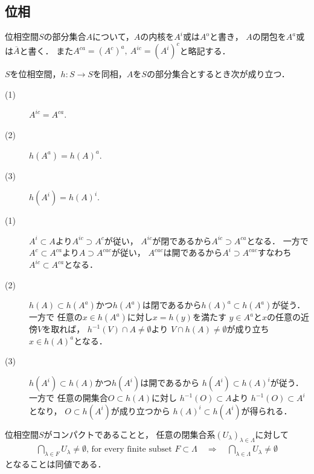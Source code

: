\subsection{位相}
	位相空間$S$の部分集合$A$について，$A$の内核を$A^i$或は$A^{\mathrm{o}}$と書き，
	$A$の閉包を$A^a$或は$\overline{A}$と書く．
	また$A^{ca} = (A^c)^a,\ A^{ic} = (A^i)^c$と略記する．
	\begin{screen}
		\begin{thm}[閉包・内核]\label{thm:topology_note_closure_interior}
			$S$を位相空間，$h:S \longrightarrow S$を同相，$A$を$S$の部分集合とするとき次が成り立つ．
			\begin{description}
				\item[(1)] $A^{ic} = A^{ca}$.
				\item[(2)] $h(A^a) = h(A)^a$.
				\item[(3)] $h(A^i) = h(A)^i$.
			\end{description}
		\end{thm}
	\end{screen}
	
	\begin{prf}\mbox{}
		\begin{description}
			\item[(1)]
				$A^i \subset A$より$A^{ic} \supset A^c$が従い，
				$A^{ic}$が閉であるから$A^{ic} \supset A^{ca}$となる．
				一方で$A^c \subset A^{ca}$より$A \supset A^{cac}$が従い，
				$A^{cac}$は開であるから$A^i \supset A^{cac}$すなわち
				$A^{ic} \subset A^{ca}$となる．
			
			\item[(2)]
				$h(A) \subset h(A^a)$かつ$h(A^a)$は閉であるから$h(A)^a \subset h(A^a)$が従う．一方で
				任意の$x \in h(A^a)$に対し$x = h(y)$を満たす
				$y \in A^a$と$x$の任意の近傍$V$を取れば，
				$h^{-1}(V) \cap A \neq \emptyset$より
				$V \cap h(A) \neq \emptyset$が成り立ち
				$x \in h(A)^a$となる．
				
			\item[(3)]
				$h(A^i) \subset h(A)$かつ$h(A^i)$は開であるから
				$h(A^i) \subset h(A)^i$が従う．一方で
				任意の開集合$O \subset h(A)$に対し
				$h^{-1}(O) \subset A$より
				$h^{-1}(O) \subset A^i$となり，
				$O \subset h(A^i)$が成り立つから
				$h(A)^i \subset h(A^i)$が得られる．
				\QED
		\end{description}
	\end{prf}
	
	\begin{screen}
		\begin{thm}[有限交叉性]\label{thm:finite_intersection_property}
			位相空間$S$がコンパクトであることと，
			任意の閉集合系$(U_\lambda)_{\lambda \in \Lambda}$に対して
			\begin{align} 
				\bigcap_{\lambda \in F} U_\lambda \neq \emptyset
				\mbox{, for every finite subset $F \subset \Lambda$}
				\quad \Longrightarrow \quad \bigcap_{\lambda \in \Lambda} U_\lambda \neq \emptyset
				\label{eq:finite_intersection_property}
			\end{align}
			となることは同値である．
		\end{thm}
	\end{screen}
	
